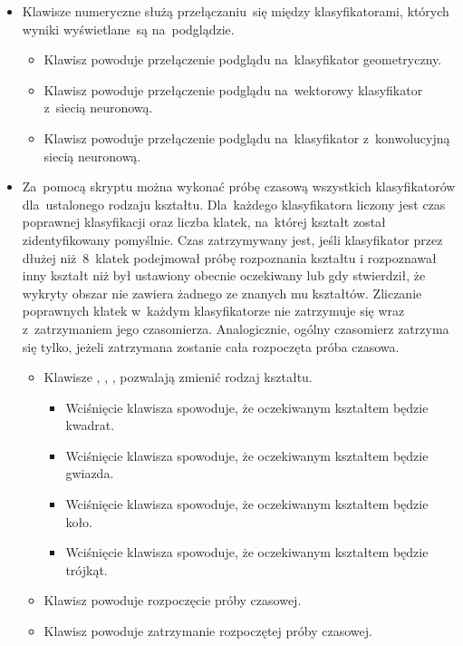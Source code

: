 \documentclass[11pt,a4paper]{article}
\begin{document}
\begin{itemize}
    \item Klawisze numeryczne służą przełączaniu~się między klasyfikatorami, których wyniki wyświetlane~są na~podglądzie.
    \begin{itemize}
        \item Klawisz  powoduje przełączenie podglądu na~klasyfikator geometryczny.
        \item Klawisz  powoduje przełączenie podglądu na~wektorowy klasyfikator z~siecią neuronową.
        \item Klawisz  powoduje przełączenie podglądu na~klasyfikator z~konwolucyjną siecią neuronową.
    \end{itemize}
    \item Za~pomocą skryptu można wykonać próbę czasową wszystkich klasyfikatorów dla~ustalonego rodzaju kształtu.
    Dla~każdego klasyfikatora liczony jest czas poprawnej klasyfikacji oraz liczba klatek, na~której kształt został zidentyfikowany pomyślnie.
    Czas zatrzymywany jest, jeśli klasyfikator przez dłużej niż~8~klatek podejmował próbę rozpoznania kształtu i rozpoznawał inny kształt niż był ustawiony obecnie oczekiwany lub gdy stwierdził, że wykryty obszar nie zawiera żadnego ze znanych mu kształtów. Zliczanie poprawnych klatek w~każdym klasyfikatorze nie zatrzymuje się wraz z~zatrzymaniem jego czasomierza. Analogicznie, ogólny czasomierz zatrzyma się tylko, jeżeli zatrzymana zostanie cała rozpoczęta próba czasowa.
    \begin{itemize}
        \item Klawisze , , ,  pozwalają zmienić rodzaj kształtu.
        \begin{itemize}
            \item Wciśnięcie klawisza  spowoduje, że oczekiwanym kształtem będzie kwadrat.
            \item Wciśnięcie klawisza  spowoduje, że oczekiwanym kształtem będzie gwiazda.
            \item Wciśnięcie klawisza  spowoduje, że oczekiwanym kształtem będzie koło.
            \item Wciśnięcie klawisza  spowoduje, że oczekiwanym kształtem będzie trójkąt.
        \end{itemize}
        \item Klawisz  powoduje rozpoczęcie próby czasowej.
        \item Klawisz  powoduje zatrzymanie rozpoczętej próby czasowej.

\end{itemize}
\end{itemize}
\end{document}
